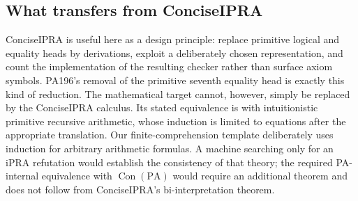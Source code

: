 \subsection{What transfers from ConciseIPRA}

ConciseIPRA is useful here as a design principle: replace primitive
logical and equality heads by derivations, exploit a deliberately
chosen representation, and count the implementation of the resulting
checker rather than surface axiom symbols. PA196's removal of the
primitive seventh equality head is exactly this kind of reduction.
The mathematical target cannot, however, simply be replaced by the
ConciseIPRA calculus. Its stated equivalence is with intuitionistic
primitive recursive arithmetic, whose induction is limited to
equations after the appropriate translation. Our finite-comprehension
template deliberately uses induction for arbitrary arithmetic
formulas. A machine searching only for an iPRA refutation would
establish the consistency of that theory; the required PA-internal
equivalence with $\operatorname{Con}(\mathrm{PA})$ would require an
additional theorem and does not follow from ConciseIPRA's
bi-interpretation theorem.
